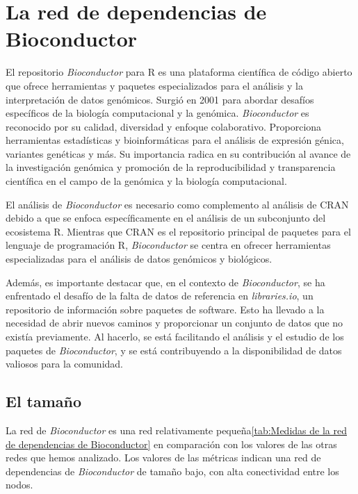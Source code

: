 \section{La red de dependencias de Bioconductor}

El repositorio \textit{Bioconductor} para R es una plataforma científica de código abierto que ofrece
herramientas y paquetes especializados para el análisis y la interpretación de datos genómicos.
Surgió en 2001 para abordar desafíos específicos de la biología computacional y la genómica.
\textit{Bioconductor} es reconocido por su calidad, diversidad y enfoque colaborativo. Proporciona
herramientas estadísticas y bioinformáticas para el análisis de expresión génica, variantes genéticas y más.
Su importancia radica en su contribución al avance de la investigación genómica y promoción de la
reproducibilidad y transparencia científica en el campo de la genómica y la biología computacional.

El análisis de \textit{Bioconductor} es necesario como complemento al análisis de CRAN debido a que se
enfoca específicamente en el análisis de un subconjunto del ecosistema R. Mientras que CRAN es el
repositorio principal de paquetes para el lenguaje de programación R, \textit{Bioconductor} se centra
en ofrecer herramientas especializadas para el análisis de datos genómicos y biológicos.

Además, es importante destacar que, en el contexto de \textit{Bioconductor}, se ha enfrentado el
desafío de la falta de datos de referencia en \textit{libraries.io}, un repositorio de información
sobre paquetes de software. Esto ha llevado a la necesidad de abrir nuevos caminos y proporcionar
un conjunto de datos que no existía previamente. Al hacerlo, se está facilitando el análisis y el
estudio de los paquetes de \textit{Bioconductor}, y se está contribuyendo a la disponibilidad de
datos valiosos para la comunidad.

\subsection{El tamaño}

La red de \textit{Bioconductor} es una red relativamente pequeña\ref{tab:Medidas de la red de dependencias de Bioconductor}
en comparación con los valores de las otras redes que hemos analizado.
Los valores de las métricas indican una red de dependencias de \textit{Bioconductor} de tamaño bajo,
con alta conectividad entre los nodos.

